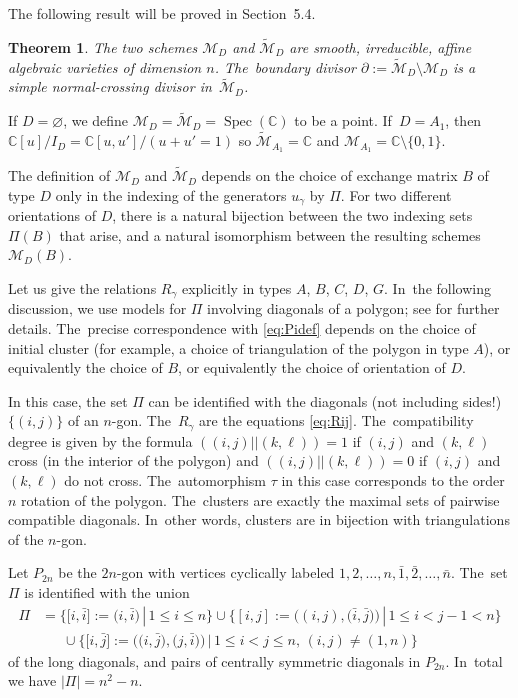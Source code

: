 \documentclass[pdftex]{sigma}%
\def\C{{\mathbb C}}
\def\Spec{\operatorname{Spec}}
\def\M{{\mathcal{M}}}
\def\tM{{\widetilde {\mathcal{M}}}}
\numberwithin{equation}{section}
\newtheorem{Theorem}{Theorem}[section]
\begin{document}
The following result will be proved in Section~5.4.

\begin{Theorem}\label{thm:geom}
The two schemes $\M_D$ and $\tM_D$ are smooth, irreducible, affine algebraic varieties of dimension $n$. The~boundary divisor $\partial:= \tM_D \setminus \M_D$ is a simple normal-crossing divisor in~$\tM_D$.
\end{Theorem}

If $D = \varnothing$, we define $\M_D = \tM_D = \Spec(\C)$ to be a point. If~$D = A_1$, then $\C[u]/I_D = \C[u,u']/(u+u'=1)$ so $\tM_{A_1} = \C$ and $\M_{A_1} = \C \setminus \{0,1\}$.

\begin{Remark}
The definition of $\M_D$ and $\tM_D$ depends on the choice of exchange matrix $B$ of type $D$ only in the indexing of the generators $u_\gamma$ by $\Pi$. For two different orientations of $D$, there is a natural bijection between the two indexing sets $\Pi(B)$ that arise, and a natural isomorphism between the resulting schemes $\M_D(B)$.
\end{Remark}

\medskip{} %
Let us give the relations $R_\gamma$ explicitly in types $A$, $B$, $C$, $D$, $G$. In~the following discussion, we use models for $\Pi$ involving diagonals of a polygon; see \cite{CA2} for further details. The~precise correspondence with \eqref{eq:Pidef} depends on the choice of initial cluster (for example, a choice of triangulation of the polygon in type $A$), or equivalently the choice of $B$, or equivalently the choice of orientation of $D$.

\medskip{} In this case, the set $\Pi$ can be identified with the diagonals (not including sides!) $\{(i,j)\}$ of an $n$-gon. The~$R_\gamma$ are the equations \eqref{eq:Rij}. The~compatibility degree is given by the formula $((i,j) || (k,\ell)) = 1$ if $(i,j)$ and $(k,\ell)$ cross (in the interior of the polygon) and $((i,j) || (k,\ell)) = 0$ if $(i,j)$ and $(k,\ell)$ do not cross. The~automorphism $\tau$ in this case corresponds to the order $n$ rotation of the polygon. The~clusters are exactly the maximal sets of pairwise compatible diagonals. In~other words, clusters are in bijection with triangulations of the $n$-gon.

\medskip{} Let $P_{2n}$ be the $2n$-gon with vertices cyclically labeled $1,2,\dots,n,\bar 1,\bar 2,\dots, \bar n$. The~set $\Pi$ is identified with the union
\begin{align}
\Pi &= \Big\{\big[i,\bar i\big]:= \big(i,\bar i\big) \,|\, 1 \leq i \leq n\Big\}
\cup \Big\{[i, j] := \big((i,j),\big(\bar i, \bar j\big)\big) \,|\, 1 \leq i <j-1 < n\Big\}\nonumber
\\
&{}\phantom{=\ }\cup \Big\{\big[i,\bar j\big] := \big(\big(i,\bar j\big),\big(j, \bar i\big)\big) \,|\, 1 \leq i < j \leq n, \, (i,j) \neq (1,n)\Big\}
\label{eq:PiC}
\end{align}
of the long diagonals, and pairs of centrally symmetric diagonals in $P_{2n}$. In~total we have $|\Pi| = n^2-n$.
\end{document}
